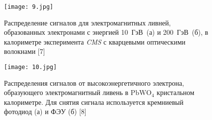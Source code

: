 \begin{figure}[H]
    \centering
    \texttt{[image: 9.jpg]}
    \caption{Распределение сигналов для электромагнитных ливней, образованных электронами с энергией \mbox{10 ГэВ (а)} и \mbox{200 ГэВ (б)}, в калориметре эксперимента \textit{CMS} с кварцевыми оптическими волокнами [7]}
    \label{fig:poissons}
\end{figure}

\begin{figure}[H]
    \centering
    \texttt{[image: 10.jpg]}
    \caption{Распределения сигналов от высокоэнергетичного электрона, образующего электромагнитный ливень в $\mathrm{PbWO}_{\mathrm{4}}$ кристальном калориметре. Для снятия сигнала используется кремниевый фотодиод (а) и ФЭУ (б) [8]}
    \label{fig:photPMT}
\end{figure}


